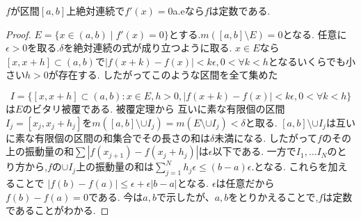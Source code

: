 \begin{lem}
$f$が区間$[a,b]$上絶対連続で$f'(x) =0$a.eなら$f$は定数である.
\end{lem}
\begin{proof}
$E = \{ x \in (a,b) \mid f'(x) = 0 \}$とする.$m([a,b] \setminus E) = 0$となる.
任意に$\epsilon > 0$を取る.$\delta$を絶対連続の式が成り立つように取る.
$x \in E$なら$[x, x+h] \subset (a, b)$で$|f(x + k) - f(x)| < k \epsilon, 0 < \forall k < h$となるいくらでも小さい$h > 0$が存在する.
したがってこのような区間を全て集めた

\begin{equation*}
I = \{ [x, x +h] \subset (a,b) : x \in E, h> 0, |f(x+k) - f(x) | < k\epsilon, 0 < \forall k < h \}    
\end{equation*}
は$E$のビタリ被覆である.
被覆定理から
互いに素な有限個の区間$I_j = [x_j, x_j+ h_j]$を$m([a,b] \setminus \cup I_j) = m(E \setminus \cup I_j) < \delta $と取る.
$[a, b] \setminus \cup I_j$は互いに素な有限個の区間の和集合でその長さの和は$\delta$未満になる.
したがって$f$のその上の振動量の和$\sum |f(x_{j+1}) - f(x_j + h_j)|$は$\epsilon$以下である.
一方で$I_1, \ldots I_N$のとり方から,$f$の$\cup I_j$上の振動量の和は$\sum_{j=1}^N h_j  \epsilon \le (b-a) \epsilon$.となる.
これらを加えることで
$|f(b) - f(a) |  \le \epsilon + \epsilon |b-a|$となる.
$\epsilon$は任意だから$f(b) - f(a) =0$である.
今は$a,b$で示したが、$a,b$をとりかえることで,$f$は定数であることがわかる.
\end{proof}


